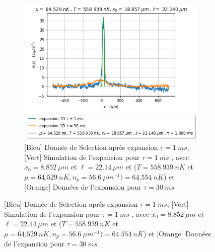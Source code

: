 \documentclass[a3, 10pt,twoside]{article}          %
\theoremstyle{plain}
\theoremstyle{definition}
\theoremstyle{remark}
\theoremstyle{definition} %
\begin{document}
\begin{figure}[H]
\begin{subfigure}[b]{0.45\textwidth}
        		\includegraphics[width=\textwidth]{Figures/simul_expansion_1_24-04-2024-1.2.png}
        		\caption{{\color{blue}[Bleu] Donnée de Selection après expansion $\tau = 1~ms$}, {\color{OliveGreen}[Vert]  Simulation de l'expansion pour $\tau= 1~ms$  , avec $x_0 = 8.852 ~\mu m $ et $\ell = 22.14~ \mu m $ et ($T = 558.939 ~nK$ et $\mu=64.529 ~nK  , n_p = 56.6 ~{\mu m}^{-1} )= 64.554~nK$)} et { \color{orange}[Orange] Données de l'expansion pour $\tau = 30~ms$  } }
        		\label{fig1.2:expansion1}
    		\end{subfigure}
    		
    		\vspace{1em}
    		

\end{figure}
\end{document}
